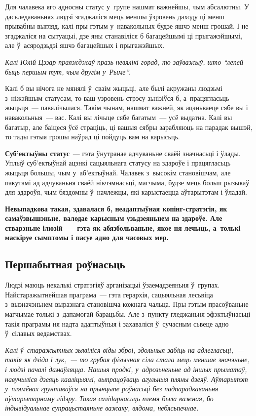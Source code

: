 Для чалавека яго адносны статус у~групе нашмат важнейшы, чым абсалютны. У дасьледаваньнях людзі згаджаліся мець меншы ўзровень даходу ці менш прывабны выгляд, калі пры гэтым у~навакольных будзе яшчэ менш грошай. І не згаджаліся на сытуацыі, дзе яны станавіліся б багацейшымі ці прыгажэйшымі, але ў~асяродзьдзі яшчэ багацейшых і прыгажэйшых.

\emph{Калі Юлій Цэзар праяжджаў празь невялікі горад, то заўважыў, што ``лепей быць першым тут, чым другім у~Рыме''.}


Калі б вы нічога не мянялі ў~сваім жыцьці, але былі акружаны людзьмі з~ніжэйшым статусам, то ваш узровень стрэсу зьнізіўся б, а~працягласьць жыцьця~--- павялічылася. Такім чынам, нашмат важней, як ацэньваеце сябе вы і навакольныя~--- вас. Калі вы лічыце сябе багатым~--- усё выдатна. Калі вы багатыр, але баіцеся ўсё страціць, ці вашыя сябры зарабляюць на парадак вышэй, то тады гэтыя грошы наўрад ці пойдуць вам на карысьць.

\textbf{Суб'ектыўны статус}~--- гэта ўнутранае адчуваньне сваёй значнасьці і ўлады. Уплыў суб'ектыўнай ацэнкі сацыяльнага статусу на здароўе і працягласьць жыцьця большы, чым у~аб'ектыўнай. Чалавек з~высокім становішчам, але пакутамі ад адчуваньня сваёй нікчэмнасьці, магчыма, будзе мець больш рызыкаў для здароўя, чым бяздомны ў~начлежцы, які карыстаецца аўтарытэтам і ўладай. 

\textbf{Невыпадкова такая, здавалася б, неадаптыўная копінг-стратэгія, як самаўзвышэньне, валодае карысным узьдзеяньнем на здароўе. Але стварэньне ілюзій~--- гэта як абязбольваньне, якое ня лечыць, а~толькі маскіруе сымптомы і пасуе адно для часовых мер.}

\subsection*{Першабытная роўнасьць}

Людзі маюць некалькі стратэгіяў арганізацыі ўзаемадзеяньня ў~групах. Найстаражытнейшая праграма~--- гэта герархія, сацыяльная лесьвіца з~вызначэньнем выразнага становішча кожнага чальца. Пры гэтым прасоўваньне магчымае толькі з~дапамогай барацьбы. Але з~пункту гледжаньня эфэктыўнасьці такія праграмы ня надта адаптыўныя і захаваліся ў~сучасным сьвеце адно ў~сілавых ведамствах.

\emph{Калі ў~старажытных зьявіліся віды зброі, здольныя забіць на адлегласьці,~--- такія як дзіда і лук,~--- то грубая фізычная сіла стала мець меншае значэньне, і людзі пачалі дамаўляцца. Нашыя продкі, у~адрозьненьне ад іншых прыматаў, навучыліся дзеяць кааліцыямі, выпрацоўваць агульныя пляны дзеяў. Аўтарытэт у~плямёнах грунтаваўся на прынцыпе роўнасьці без падпарадкаваньня аўтарытарнаму лідэру. Такая салідарнасьць племя была важная, бо індывідуальнае супрацьстаяньне важаку, вядома, небясьпечнае.}


